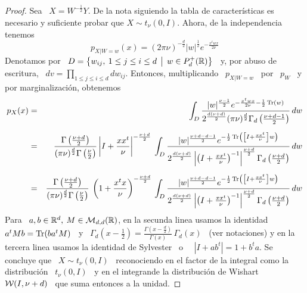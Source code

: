 \begin{proof}
  Sea \ $X = W^{-\frac12} Y$. De la nota siguiendo la tabla de caracter\'isticas
  es  necesario  y suficiente  probar  que $X  \sim  t_\nu(0,I)$.  Ahora, de  la
  independencia tenemos
  \[
  p_{X|W=w}(x)  = (2  \pi \nu)^{-\frac{d}{2}}  |w|^{\frac12} e^{-  \frac{x^t w  x}{2
      \nu}}
  \]
  Denotamos  por \  $D =  \left\{ w_{ij},  \: 1  \le j  \le i  \le d  \:\: \big| \:\:  w \in
    P_d^+(\mathbb{R}) \right\}$ \ y, por abuso de  escritura, \ $dv = \prod_{ 1 \le j
    \le i \le d} dw_{ij}$.  Entonces,  multiplicando \ $p_{X|W=w}$ \ por \ $p_W$
  \ y por marginalizaci\'on, obtenemos
  \begin{eqnarray*}
  p_X(x) & = & \int_D \frac{|w|^{\frac{\nu-1}{2}} e^{- \frac{x^t w x}{2 \nu} -
  \frac12 \operatorname{Tr}(w)}}{2^{\frac{d (\nu+d)}{2}} (\pi \nu)^{\frac{d}{2}} \Gamma_d \left(
  \frac{\nu+d-1}{2} \right)} \, dw\\[2mm]
  & = & \frac{\Gamma\left( \frac{\nu+d}{2} \right)}{(\pi \nu)^{\frac{d}{2}}
  \Gamma\left( \frac{\nu}{2} \right)} \left| I + \frac{x x^t}{\nu}
  \right|^{-\frac{\nu+d}{2}} \: \int_D \frac{|w|^{\frac{\nu+d-d-1}{2}} e^{-
  \frac12 \operatorname{Tr}\left( \left[ I + \frac{x x^t}{\nu} \right] w \right)}}{2^{\frac{d
  (\nu+d)}{2}} \left| \left( I + \frac{x x^t}{\nu} \right)^{-1}
  \right|^{\frac{\nu+d}{2}} \Gamma_d \left( \frac{\nu+d}{2} \right)} \, dw\\[2mm]
  & = & \frac{\Gamma\left( \frac{\nu+d}{2} \right)}{(\pi \nu)^{\frac{d}{2}}
  \Gamma\left( \frac{\nu}{2} \right)} \: \left( 1 + \frac{x^t x}{\nu}
  \right)^{-\frac{\nu+d}{2}} \, \int_D \frac{|w|^{\frac{\nu+d-d-1}{2}} e^{-
  \frac12 \operatorname{Tr}\left( \left[ I + \frac{x x^t}{\nu} \right] w \right)}}{2^{\frac{d
  (\nu+d)}{2}} \left| \left( I + \frac{x x^t}{\nu} \right)^{-1}
  \right|^{\frac{\nu+d}{2}} \Gamma_d \left( \frac{\nu+d}{2} \right)} \, dw
  \end{eqnarray*}
%
  Para  \ $a, b  \in \mathbb{R}^d,  \: M  \in \mathcal{M}_{d,d}(\mathbb{R})$,  en la  secunda linea
  usamos la  identidad \  $a^t M b  = \operatorname{Tr}(b a^t  M)$ \  y \ $\Gamma_d\left(  x -
    \frac12 \right) = \frac{\Gamma\left(  x - \frac{d}{2} \right)}{\Gamma(x)} \,
  \Gamma_d(x)$ \ (ver  notaciones) y en la tercera linea  usamos la identidad de
  Sylvester~\cite{Syl51} o~\cite[\S~18.1]{Har08} \ $\left|  I + a b^t\right| = 1
  + b^t a$. Se concluye que \ $X \sim t_\nu(0,I)$ \ reconociendo en el factor de
  la integral  como la  distribuci\'on \  $t_\nu(0,I)$ \ y  en el  integrande la
  distribuci\'on de Wishart \ $\mathcal{W}(I,\nu+d)$ \ que suma entonces a la unidad.
\end{proof}

